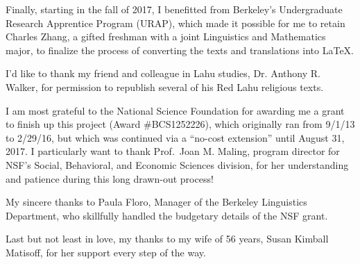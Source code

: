 Finally, starting in the fall of 2017, I benefitted from Berkeley's
Undergraduate Research Apprentice Program (URAP), which made it possible
for me to retain Charles Zhang, a gifted freshman with a joint Linguistics
and Mathematics major, to finalize the process of converting the
texts and translations into LaTeX.

I'd like to thank my friend and colleague in Lahu studies, Dr. Anthony
R. Walker, for permission to republish several of his Red Lahu religious
texts.

I am most grateful to the National Science Foundation for awarding me
a grant to finish up this project (Award \#BCS1252226), which
originally ran from 9/1/13 to 2/29/16, but which was continued via a
``no-cost extension'' until August 31, 2017. I particularly want to
thank Prof.\ Joan M. Maling, program director for NSF's Social,
Behavioral, and Economic Sciences division, for her understanding and
patience during this long drawn-out process!

My sincere thanks to Paula Floro, Manager of the Berkeley Linguistics
Department, who skillfully handled the budgetary details of the NSF
grant.

Last but not least in love, my thanks to my wife of 56 years, Susan
Kimball Matisoff, for her support every step of the way.